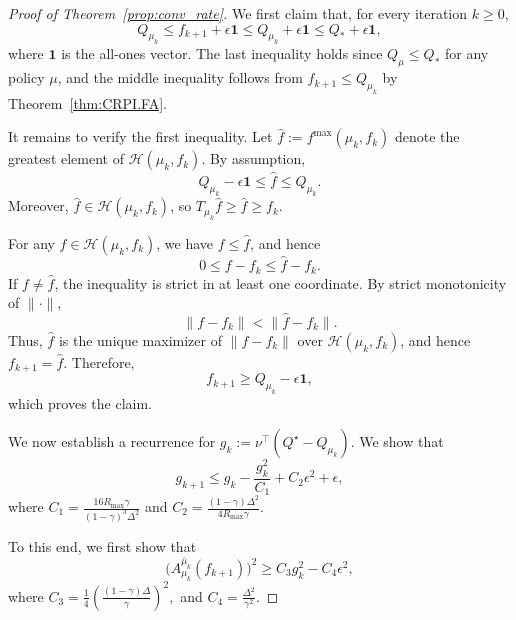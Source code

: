 \documentclass[twoside]{article}
\theoremstyle{plain}
\theoremstyle{definition}
\theoremstyle{remark}
\newcommand{\QS}{Q_*}
\newcommand{\ones}{\mathbf{1}}
\begin{document}
\begin{proof}[Proof of Theorem~\ref{prop:conv_rate}]
%
We first claim that, for every iteration $k \geq 0,$
%
\begin{equation}
\label{e:Q.mu.k.Q.S.rel}
    Q_{\mu_k} 
    \leq f_{k + 1} + \epsilon \ones 
    \leq Q_{\mu_k} + \epsilon \ones 
    \leq \QS + \epsilon \ones,
\end{equation}
%
where $\ones$ is the all-ones vector. The last inequality holds since $Q_\mu \leq \QS$ for any policy $\mu$, and the middle inequality follows from $f_{k+1} \le Q_{\mu_k}$ by Theorem~\ref{thm:CRPI.FA}. 

It remains to verify the first inequality. Let $\hat f := f^{\max}(\mu_k,f_k)$ denote the greatest element of $\mathcal H(\mu_k,f_k)$. By assumption,
\[
    Q_{\mu_k} - \epsilon \ones \le \hat f \le Q_{\mu_k}.
\]
Moreover, $\hat f \in \mathcal H(\mu_k,f_k)$, so $T_{\mu_k}\hat f \ge \hat f \ge f_k$. 

For any $f \in \mathcal H(\mu_k,f_k)$, we have $f \le \hat f$, and hence
\[
    0 \le f - f_k \le \hat f - f_k.
\]
If $f \neq \hat f$, the inequality is strict in at least one coordinate. By strict monotonicity of $\|\cdot\|$,
\[
    \|f - f_k\| < \|\hat f - f_k\|.
\]
Thus, $\hat f$ is the unique maximizer of $\|f - f_k\|$ over $\mathcal H(\mu_k,f_k)$, and hence $f_{k+1} = \hat f$. Therefore,
\[
    f_{k+1} \ge Q_{\mu_k} - \epsilon \ones,
\]
which proves the claim.

\vspace{0.5em}

We now establish a recurrence for $g_k := \nu^\top(Q^\star - Q_{\mu_k})$. We show that
\begin{equation}
\label{eq:gk_recursive_rel}
    g_{k+1} \le g_k - \frac{g_k^2}{C_1} + C_2 \epsilon^2 + \epsilon,
\end{equation}
where $C_1 = \frac{16 R_{\max} \gamma}{(1 - \gamma)^3 \Delta^2}$ and 
$C_2 = \frac{(1 - \gamma) \Delta^2}{4 R_{\max} \gamma}$.

To this end, we first show that
\begin{equation}
\label{eq:conv_rate_relative_adv_sq}
    \big(A_{\mu_k}^{\bar\mu_k}(f_{k+1})\big)^2 
    \ge C_3 g_k^2 - C_4 \epsilon^2,
\end{equation}
where $C_3 = \frac{1}{4}\left(\frac{(1-\gamma)\Delta}{\gamma}\right)^2,$ and $C_4 = \frac{\Delta^2}{\gamma^2}.$


\end{proof}
\end{document}
